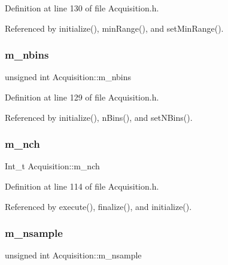 Definition at line 130 of file Acquisition.\+h.



Referenced by initialize(), min\+Range(), and set\+Min\+Range().

\mbox{\label{classAcquisition_a05bccdc4b9ada37beaeba8794ccef12d}} 
\subsubsection{\texorpdfstring{m\+\_\+nbins}{m\_nbins}}
{\footnotesize\ttfamily unsigned int Acquisition\+::m\+\_\+nbins\hspace{0.3cm}{\ttfamily [private]}}



Definition at line 129 of file Acquisition.\+h.



Referenced by initialize(), n\+Bins(), and set\+N\+Bins().

\mbox{\label{classAcquisition_a1860c7a03a65ea7a778d30dd4a40e1e1}} 
\subsubsection{\texorpdfstring{m\+\_\+nch}{m\_nch}}
{\footnotesize\ttfamily Int\+\_\+t Acquisition\+::m\+\_\+nch\hspace{0.3cm}{\ttfamily [private]}}



Definition at line 114 of file Acquisition.\+h.



Referenced by execute(), finalize(), and initialize().

\mbox{\label{classAcquisition_a26d0f1a44309ffac49c365b7ee568ab2}} 
\subsubsection{\texorpdfstring{m\+\_\+nsample}{m\_nsample}}
{\footnotesize\ttfamily unsigned int Acquisition\+::m\+\_\+nsample\hspace{0.3cm}{\ttfamily [private]}}



